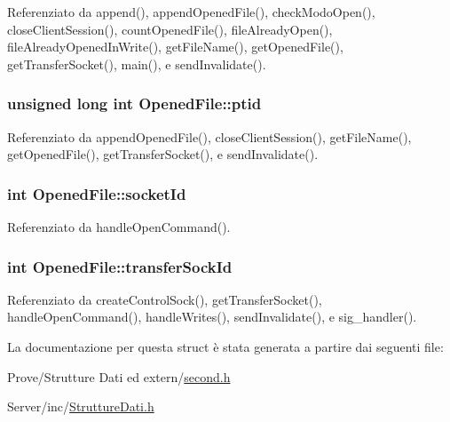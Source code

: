 Referenziato da append(), append\+Opened\+File(), check\+Modo\+Open(), close\+Client\+Session(), count\+Opened\+File(), file\+Already\+Open(), file\+Already\+Opened\+In\+Write(), get\+File\+Name(), get\+Opened\+File(), get\+Transfer\+Socket(), main(), e send\+Invalidate().

\hypertarget{structOpenedFile_a33cb5376fd14129a1635cf142c0781a6}{
\subsubsection[{ptid}]{\setlength{\rightskip}{0pt plus 5cm}unsigned long int Opened\+File\+::ptid}}\label{structOpenedFile_a33cb5376fd14129a1635cf142c0781a6}


Referenziato da append\+Opened\+File(), close\+Client\+Session(), get\+File\+Name(), get\+Opened\+File(), get\+Transfer\+Socket(), e send\+Invalidate().

\hypertarget{structOpenedFile_a2af35018ecff06dbd349d464c815038a}{
\subsubsection[{socket\+Id}]{\setlength{\rightskip}{0pt plus 5cm}int Opened\+File\+::socket\+Id}}\label{structOpenedFile_a2af35018ecff06dbd349d464c815038a}


Referenziato da handle\+Open\+Command().

\hypertarget{structOpenedFile_a122a7d3d722dc1f7c63857af2024f098}{
\subsubsection[{transfer\+Sock\+Id}]{\setlength{\rightskip}{0pt plus 5cm}int Opened\+File\+::transfer\+Sock\+Id}}\label{structOpenedFile_a122a7d3d722dc1f7c63857af2024f098}


Referenziato da create\+Control\+Sock(), get\+Transfer\+Socket(), handle\+Open\+Command(), handle\+Writes(), send\+Invalidate(), e sig\+\_\+handler().



La documentazione per questa struct è stata generata a partire dai seguenti file\+:\begin{DoxyCompactItemize}
\item 
Prove/\+Strutture Dati ed extern/\hyperlink{second_8h}{second.\+h}\item 
Server/inc/\hyperlink{StruttureDati_8h}{Strutture\+Dati.\+h}\end{DoxyCompactItemize}
